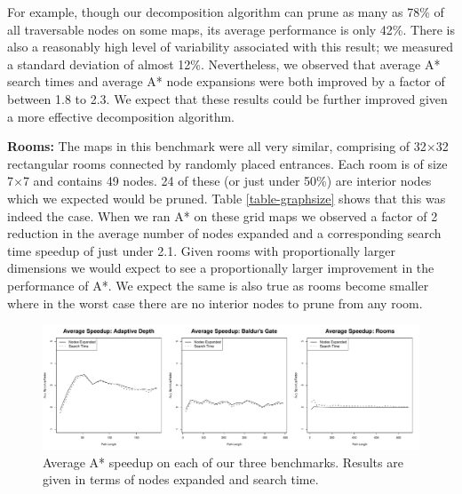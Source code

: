 For example, though our decomposition algorithm can prune as many as 78\% of all
traversable nodes on some maps, its average performance is only
42\%.  There is also a reasonably high level of variability associated with this result;
we measured a standard deviation of almost 12\%. 
Nevertheless, we observed that average A* search times and average A* node expansions
were both improved by a factor of between 1.8 to 2.3. 
We expect that these results could be
further improved given a more effective decomposition algorithm.
\par 
\textbf{Rooms:} 
The maps in this benchmark were all very similar, comprising of
32$\times$32 rectangular rooms connected by randomly placed entrances.
Each room is of size 7$\times$7 and contains 49 nodes.  
24 of these
(or just under 50\%) are interior nodes which we expected would be
pruned.  
Table \ref{table-graphsize} shows that this was indeed the case.
When we ran A* on these grid maps we observed a factor of 2 reduction 
in the average number of nodes expanded and a corresponding search time
speedup of just under 2.1.
Given rooms with proportionally larger dimensions
we would expect to see a proportionally larger improvement in the
performance of A*.  We expect the same is also true as rooms become
smaller where in the worst case there are no interior nodes to prune
from any room.

\begin{figure}[t]
       \begin{center}
                       \includegraphics[width=1.95\columnwidth, trim = 10mm 10mm 10mm 0mm]{diagrams/speedup.pdf}
       \end{center}
       \caption{Average A* speedup on each of our three benchmarks. 
		Results are given in terms of nodes expanded and search time.}
\label{fig-speedup}
\end{figure}
